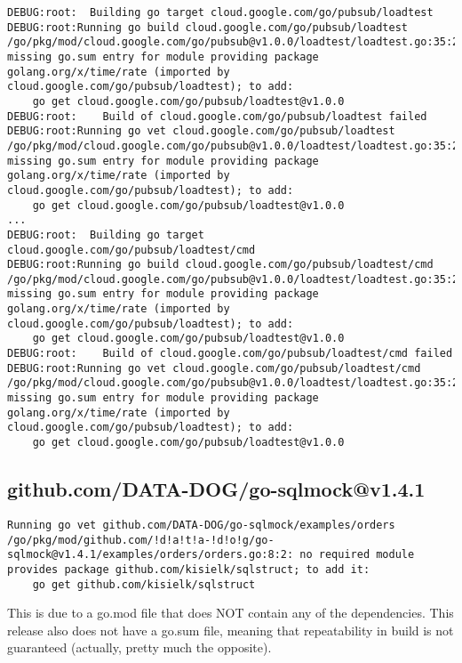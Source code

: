 \begin{verbatim}
DEBUG:root:  Building go target cloud.google.com/go/pubsub/loadtest
DEBUG:root:Running go build cloud.google.com/go/pubsub/loadtest
/go/pkg/mod/cloud.google.com/go/pubsub@v1.0.0/loadtest/loadtest.go:35:2: missing go.sum entry for module providing package golang.org/x/time/rate (imported by cloud.google.com/go/pubsub/loadtest); to add:
	go get cloud.google.com/go/pubsub/loadtest@v1.0.0
DEBUG:root:    Build of cloud.google.com/go/pubsub/loadtest failed
DEBUG:root:Running go vet cloud.google.com/go/pubsub/loadtest
/go/pkg/mod/cloud.google.com/go/pubsub@v1.0.0/loadtest/loadtest.go:35:2: missing go.sum entry for module providing package golang.org/x/time/rate (imported by cloud.google.com/go/pubsub/loadtest); to add:
	go get cloud.google.com/go/pubsub/loadtest@v1.0.0
...
DEBUG:root:  Building go target cloud.google.com/go/pubsub/loadtest/cmd
DEBUG:root:Running go build cloud.google.com/go/pubsub/loadtest/cmd
/go/pkg/mod/cloud.google.com/go/pubsub@v1.0.0/loadtest/loadtest.go:35:2: missing go.sum entry for module providing package golang.org/x/time/rate (imported by cloud.google.com/go/pubsub/loadtest); to add:
	go get cloud.google.com/go/pubsub/loadtest@v1.0.0
DEBUG:root:    Build of cloud.google.com/go/pubsub/loadtest/cmd failed
DEBUG:root:Running go vet cloud.google.com/go/pubsub/loadtest/cmd
/go/pkg/mod/cloud.google.com/go/pubsub@v1.0.0/loadtest/loadtest.go:35:2: missing go.sum entry for module providing package golang.org/x/time/rate (imported by cloud.google.com/go/pubsub/loadtest); to add:
	go get cloud.google.com/go/pubsub/loadtest@v1.0.0
\end{verbatim}

\subsection{github.com/DATA-DOG/go-sqlmock@v1.4.1}
\begin{verbatim}
Running go vet github.com/DATA-DOG/go-sqlmock/examples/orders
/go/pkg/mod/github.com/!d!a!t!a-!d!o!g/go-sqlmock@v1.4.1/examples/orders/orders.go:8:2: no required module provides package github.com/kisielk/sqlstruct; to add it:
	go get github.com/kisielk/sqlstruct

\end{verbatim}

This is due to a go.mod file that does NOT contain any of the
dependencies. This release also does not have a go.sum file, meaning
that repeatability in build is not guaranteed (actually, pretty much
the opposite).

